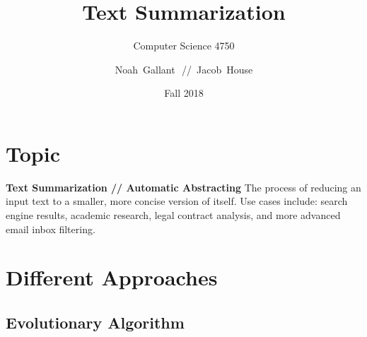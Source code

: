 \documentclass[xcolor={usenames,dvipsnames,svgnames},handouts]{beamer}
\title{Text Summarization}
\subtitle{Computer Science 4750}
\author{Noah~Gallant\,~//~Jacob~House}
\date{Fall 2018}
\begin{document}
\begin{frame}[plain]
\titlepage
\end{frame}

\startheads

\section{Topic}
\begin{frame}

{\large\bfseries Text Summarization // Automatic Abstracting}
\vskip 6pt
The process of reducing an input text to a smaller, more concise version of itself.
\vskip 6pt
Use cases include: search engine results, academic research, legal contract analysis, and more advanced email inbox filtering.
\vfill

\end{frame}

\section{Different Approaches}

\subsection{Evolutionary Algorithm}
\end{document}
